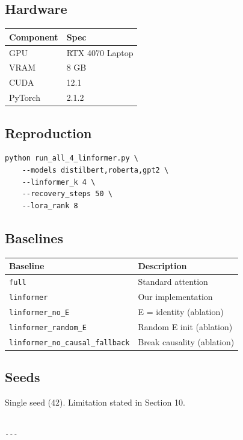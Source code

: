 \subsection{Hardware}

\begin{table}[H]
\centering
\small
\begin{tabular}{ll}
\toprule
\textbf{Component} & \textbf{Spec} \\
\midrule
GPU & RTX 4070 Laptop \\
VRAM & 8 GB \\
CUDA & 12.1 \\
PyTorch & 2.1.2 \\
\bottomrule
\end{tabular}
\end{table}

\subsection{Reproduction}

\begin{lstlisting}
python run_all_4_linformer.py \
    --models distilbert,roberta,gpt2 \
    --linformer_k 4 \
    --recovery_steps 50 \
    --lora_rank 8
\end{lstlisting}

\subsection{Baselines}

\begin{table}[H]
\centering
\small
\begin{tabular}{ll}
\toprule
\textbf{Baseline} & \textbf{Description} \\
\midrule
\texttt{full} & Standard attention \\
\texttt{linformer} & Our implementation \\
\texttt{linformer\_no\_E} & E = identity (ablation) \\
\texttt{linformer\_random\_E} & Random E init (ablation) \\
\texttt{linformer\_no\_causal\_fallback} & Break causality (ablation) \\
\bottomrule
\end{tabular}
\end{table}

\subsection{Seeds}

Single seed (42). Limitation stated in Section 10.
\begin{lstlisting}

---
\end{lstlisting}